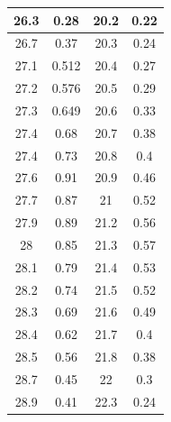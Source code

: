 \documentclass[a4paper]{article}
\begin{document}
\begin{enumerate}
\begin{table}[h]
\begin{tabular}{|c|c|c|c|}
                  26.3                        & 0.28                       & 20.2     & 0.22   \\ \hline
                  26.7                        & 0.37                       & 20.3     & 0.24   \\ \hline
                  27.1                        & 0.512                      & 20.4     & 0.27   \\ \hline
                  27.2                        & 0.576                      & 20.5     & 0.29   \\ \hline
                  27.3                        & 0.649                      & 20.6     & 0.33   \\ \hline
                  27.4                        & 0.68                       & 20.7     & 0.38   \\ \hline
                  27.4                        & 0.73                       & 20.8     & 0.4    \\ \hline
                  27.6                        & 0.91                       & 20.9     & 0.46   \\ \hline
                  27.7                        & 0.87                       & 21       & 0.52   \\ \hline
                  27.9                        & 0.89                       & 21.2     & 0.56   \\ \hline
                  28                          & 0.85                       & 21.3     & 0.57   \\ \hline
                  28.1                        & 0.79                       & 21.4     & 0.53   \\ \hline
                  28.2                        & 0.74                       & 21.5     & 0.52   \\ \hline
                  28.3                        & 0.69                       & 21.6     & 0.49   \\ \hline
                  28.4                        & 0.62                       & 21.7     & 0.4    \\ \hline
                  28.5                        & 0.56                       & 21.8     & 0.38   \\ \hline
                  28.7                        & 0.45                       & 22       & 0.3    \\ \hline
                  28.9                        & 0.41                       & 22.3     & 0.24   \\ \hline

\end{tabular}
\end{table}
\end{enumerate}
\end{document}
